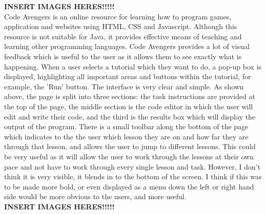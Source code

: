 \documentclass{article}
\begin{document}
\textbf{INSERT IMAGES HERES!!!!!}\\

Code Avengers is an online resource for learning how to program games, application and websites using HTML, CSS and Javascript. Although this resource is not suitable for Java, it provides effective means of teaching and learning other programming languages. Code Avengers provides a lot of visual feedback which is useful to the user as it allows them to see exactly what is happening. When a user selects a tutorial which they want to do, a pop-up box is displayed, highlighting all important areas and buttons within the tutorial, for example, the 'Run' button.  The interface is very clear and simple. As shown above, the page is split into three sections: the task instructions are provided at the top of the page, the middle section is the code editor in which the user will edit and write their code, and the third is the results box which will display the output of the program. There is a small toolbar along the bottom of the page which indicates to the the user which lesson they are on and how far they are through that lesson, and allows the user to jump to different lessons. This could be very useful as it will allow the user to work through the lessons at their own pace and not have to work through every single lesson and task. However, I don't think it is very visible, it blends in to the bottom of the screen. I think if this was to be made more bold, or even displayed as a menu down the left or right hand side would be more obvious to the users, and more useful.\\

\textbf{INSERT IMAGES HERES!!!!!}\\
\end{document}
